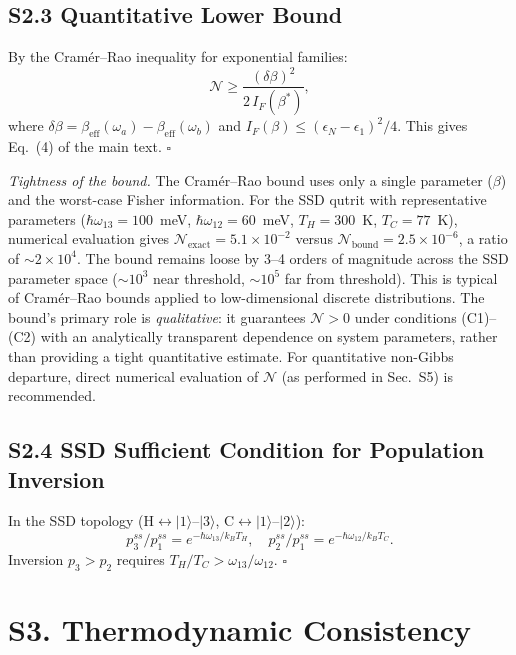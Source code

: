 \documentclass[prl,twocolumn,superscriptaddress,amsmath,amssymb]{revtex4-2}
\begin{document}
\subsection{S2.3 Quantitative Lower Bound}

By the Cram\'{e}r--Rao inequality for exponential families:
\begin{equation}
\mathcal{N} \geq \frac{(\delta\beta)^2}{2\,I_F(\beta^*)},
\end{equation}
where $\delta\beta = \beta_{\mathrm{eff}}(\omega_a) - \beta_{\mathrm{eff}}(\omega_b)$ and $I_F(\beta) \leq (\epsilon_N - \epsilon_1)^2/4$. This gives Eq.~(4) of the main text. $\square$

\textit{Tightness of the bound.} The Cram\'{e}r--Rao bound uses only a single parameter ($\beta$) and the worst-case Fisher information. For the SSD qutrit with representative parameters ($\hbar\omega_{13}=100$~meV, $\hbar\omega_{12}=60$~meV, $T_H=300$~K, $T_C=77$~K), numerical evaluation gives $\mathcal{N}_{\mathrm{exact}} = 5.1 \times 10^{-2}$ versus $\mathcal{N}_{\mathrm{bound}} = 2.5 \times 10^{-6}$, a ratio of $\sim 2\times 10^4$. The bound remains loose by 3--4 orders of magnitude across the SSD parameter space ($\sim 10^3$ near threshold, $\sim 10^5$ far from threshold). This is typical of Cram\'{e}r--Rao bounds applied to low-dimensional discrete distributions. The bound's primary role is \emph{qualitative}: it guarantees $\mathcal{N} > 0$ under conditions (C1)--(C2) with an analytically transparent dependence on system parameters, rather than providing a tight quantitative estimate. For quantitative non-Gibbs departure, direct numerical evaluation of $\mathcal{N}$ (as performed in Sec.~S5) is recommended.

\subsection{S2.4 SSD Sufficient Condition for Population Inversion}

In the SSD topology (H$\leftrightarrow|1\rangle$--$|3\rangle$, C$\leftrightarrow|1\rangle$--$|2\rangle$):
\begin{equation}
p_3^{ss}/p_1^{ss} = e^{-\hbar\omega_{13}/k_BT_H}, \quad p_2^{ss}/p_1^{ss} = e^{-\hbar\omega_{12}/k_BT_C}.
\end{equation}
Inversion $p_3 > p_2$ requires $T_H/T_C > \omega_{13}/\omega_{12}$. $\square$

\section{S3. Thermodynamic Consistency}
\end{document}
